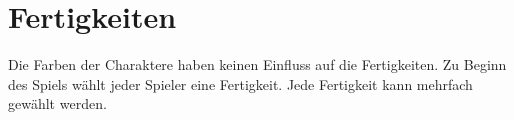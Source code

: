 \section{Fertigkeiten}

Die Farben der Charaktere haben keinen Einfluss auf die Fertigkeiten. Zu Beginn des Spiels wählt jeder Spieler eine
Fertigkeit. Jede Fertigkeit kann mehrfach gewählt werden.






